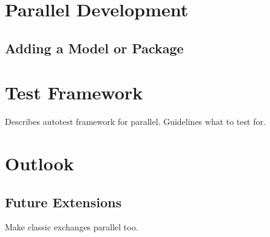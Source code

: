 \chapter{Parallel Development}

\section{Adding a Model or Package}

\chapter{Test Framework}

Describes autotest framework for parallel. Guidelines what to test for.

\chapter{Outlook}

\section{Future Extensions}
Make classic exchanges parallel too.
